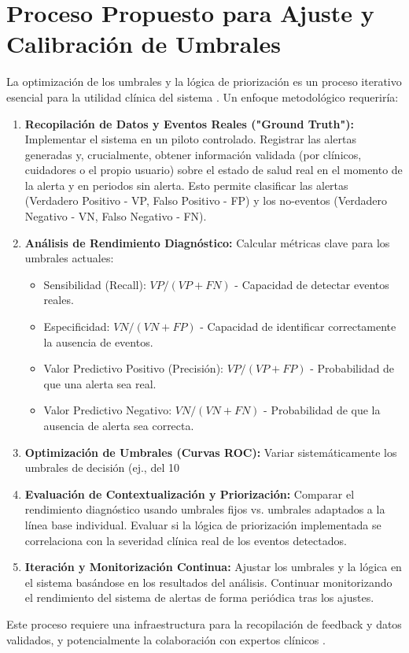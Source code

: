 \section{Proceso Propuesto para Ajuste y Calibración de Umbrales}
\label{anexo:ajuste_umbrales}
La optimización de los umbrales y la lógica de priorización es un proceso iterativo esencial para la utilidad clínica del sistema \cite{krumholz_thresholds_clinical_alerts_2011}. Un enfoque metodológico requeriría:
\begin{enumerate}
    \item \textbf{Recopilación de Datos y Eventos Reales ("Ground Truth"):} Implementar el sistema en un piloto controlado. Registrar las alertas generadas y, crucialmente, obtener información validada (por clínicos, cuidadores o el propio usuario) sobre el estado de salud real en el momento de la alerta y en periodos sin alerta. Esto permite clasificar las alertas (Verdadero Positivo - VP, Falso Positivo - FP) y los no-eventos (Verdadero Negativo - VN, Falso Negativo - FN).
    \item \textbf{Análisis de Rendimiento Diagnóstico:} Calcular métricas clave para los umbrales actuales:
        \begin{itemize}
            \item Sensibilidad (Recall): $VP / (VP + FN)$ - Capacidad de detectar eventos reales.
            \item Especificidad: $VN / (VN + FP)$ - Capacidad de identificar correctamente la ausencia de eventos.
            \item Valor Predictivo Positivo (Precisión): $VP / (VP + FP)$ - Probabilidad de que una alerta sea real.
            \item Valor Predictivo Negativo: $VN / (VN + FN)$ - Probabilidad de que la ausencia de alerta sea correcta.
        \end{itemize}
    \item \textbf{Optimización de Umbrales (Curvas ROC):} Variar sistemáticamente los umbrales de decisión (ej., del 10%
    \item \textbf{Evaluación de Contextualización y Priorización:} Comparar el rendimiento diagnóstico usando umbrales fijos vs. umbrales adaptados a la línea base individual. Evaluar si la lógica de priorización implementada se correlaciona con la severidad clínica real de los eventos detectados.
    \item \textbf{Iteración y Monitorización Continua:} Ajustar los umbrales y la lógica en el sistema basándose en los resultados del análisis. Continuar monitorizando el rendimiento del sistema de alertas de forma periódica tras los ajustes.
\end{enumerate}
Este proceso requiere una infraestructura para la recopilación de feedback y datos validados, y potencialmente la colaboración con expertos clínicos \cite{weist_validation_alert_systems_2017}.
